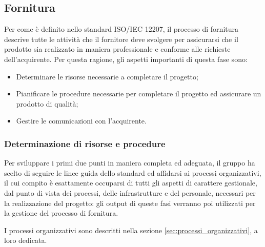 \subsection{Fornitura}\label{sec:processi_primari:fornitura}
Per come è definito nello standard ISO/IEC 12207, il processo di fornitura descrive tutte le attività che il fornitore deve svolgere per assicurarsi che il prodotto sia realizzato in maniera professionale e conforme alle richieste dell'acquirente. Per questa ragione, gli aspetti importanti di questa fase sono:
\begin{itemize}
    \item Determinare le risorse necessarie a completare il progetto;
    \item Pianificare le procedure necessarie per completare il progetto ed assicurare un prodotto di qualità;
    \item Gestire le comunicazioni con l'acquirente.
\end{itemize}
\subsubsection{Determinazione di risorse e procedure}
Per sviluppare i primi due punti in maniera completa ed adeguata, il gruppo ha scelto di seguire le linee guida dello standard ed affidarsi ai processi organizzativi, il cui compito è esattamente occuparsi di tutti gli aspetti di carattere gestionale, dal punto di vista dei processi, delle infrastrutture e del personale, necessari per la realizzazione del progetto: gli output di queste fasi verranno poi utilizzati per la gestione del processo di fornitura.
\par I processi organizzativi sono descritti nella sezione \ref{sec:processi_organizzativi}, a loro dedicata.
